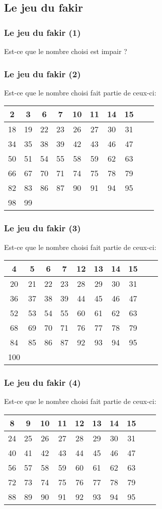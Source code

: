  \subsection{Le jeu du fakir}
  \begin{frame}[label=fakira]
    \frametitle{Le jeu du fakir (1)}
    Est-ce que le nombre choisi est impair ?
  \end{frame}
  \begin{frame}[label=fakirb]
    \frametitle{Le jeu du fakir (2)}
    Est-ce que le nombre choisi fait partie de ceux-ci:
    \begin{tabular}{|c|c|c|c|c|c|c|c|c|c|}\hline
      2&3&6&7&10&11&14&15\\\hline
      18&19&22&23&26&27&30&31\\\hline
      34&35&38&39&42&43&46&47\\\hline
      50&51&54&55&58&59&62&63\\\hline
      66&67&70&71&74&75&78&79\\\hline
      82&83&86&87&90&91&94&95\\\hline
      98&99&&&&&&\\\hline
    \end{tabular}
  \end{frame}
  \begin{frame}[label=fakirc]
    \frametitle{Le jeu du fakir (3)}
    Est-ce que le nombre choisi fait partie de ceux-ci:
    \begin{tabular}{|c|c|c|c|c|c|c|c|c|c|}\hline
      4&5&6&7&12&13&14&15\\\hline
      20&21&22&23&28&29&30&31\\\hline
      36&37&38&39&44&45&46&47\\\hline
      52&53&54&55&60&61&62&63\\\hline
      68&69&70&71&76&77&78&79\\\hline
      84&85&86&87&92&93&94&95\\\hline
      100&&&&&&&\\\hline
    \end{tabular}
  \end{frame}
  \begin{frame}[label=fakird]
    \frametitle{Le jeu du fakir (4)}
    Est-ce que le nombre choisi fait partie de ceux-ci:
    \begin{tabular}{|c|c|c|c|c|c|c|c|c|c|}\hline
      8&9&10&11&12&13&14&15\\\hline
      24&25&26&27&28&29&30&31\\\hline
      40&41&42&43&44&45&46&47\\\hline
      56&57&58&59&60&61&62&63\\\hline
      72&73&74&75&76&77&78&79\\\hline
      88&89&90&91&92&93&94&95\\\hline
    \end{tabular}
  \end{frame}
